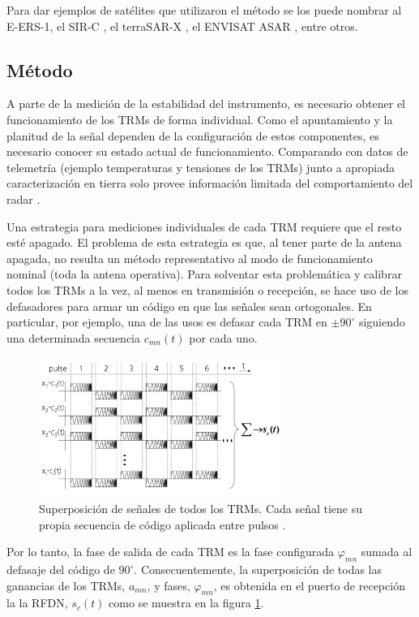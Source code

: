 Para dar ejemplos de satélites que utilizaron el método se los puede nombrar al E-ERS-1, el SIR-C \cite{Curlander1991}, el 
terraSAR-X \cite{Schwerdt2005}, el ENVISAT ASAR \cite{Loop}, entre otros.

\subsection{Método} \label{ssc:classicalMethod}

A parte de la medición de la estabilidad del instrumento, es necesario obtener el funcionamiento de los TRMs de forma 
individual. Como el apuntamiento y la planitud de la señal dependen de la configuración de estos componentes, es necesario 
conocer su estado actual de funcionamiento. Comparando con datos de telemetría (ejemplo temperaturas y tensiones de los 
TRMs) junto a apropiada caracterización en tierra solo provee información limitada del comportamiento del radar \cite{Br2007}.

Una estrategia para mediciones individuales de cada TRM requiere que el resto esté apagado. El problema de esta estrategia 
es que, al tener parte de la antena apagada, no resulta un método representativo al modo de funcionamiento nominal (toda la 
antena operativa). Para solventar esta problemática y calibrar todos los TRMs a la vez, al menos en transmisión o recepción,
se hace uso de los defasadores para armar un código en que las señales sean ortogonales. En particular, por ejemplo, una de
las usos es defasar cada TRM en $\pm90^{\circ}$ siguiendo una determinada secuencia $c_{mn}(t)$ por cada uno.

\begin{figure}
 \centering
 \includegraphics[width=8cm]{gfx/superposition_signals_classic.png}
 \caption{Superposición de señales de todos los TRMs. Cada señal tiene su propia secuencia de código aplicada entre pulsos \cite{Br2007}.}
 \label{fig:sup_sign_classic}
\end{figure}

Por lo tanto, la fase de salida de cada TRM es la fase configurada $\varphi_{mn}$ sumada al defasaje del código de 
$90^{\circ}$. Consecuentemente, la superposición de todas las ganancias de los TRMs, $a_{mn}$, y fases, $\varphi_{mn}$,
es obtenida en el puerto de recepción la la RFDN, $s_c(t)$ como se muestra en la figura \ref{fig:sup_sign_classic}.

